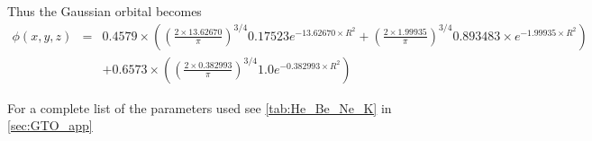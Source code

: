 Thus the Gaussian orbital becomes
\begin{eqnarray*}
\phi\left(x,y,z\right) & = & 0.4579\times\left(\left(\frac{2\times13.62670}{\pi}\right)^{3/4}0.17523e^{-13.62670\times R^{2}}+\left(\frac{2\times1.99935}{\pi}\right)^{3/4}0.893483\times e^{-1.99935\times R^{2}}\right)\\
 &  & +0.6573\times\left(\left(\frac{2\times0.382993}{\pi}\right)^{3/4}1.0e^{-0.382993\times R^{2}}\right)
\end{eqnarray*}


For a complete list of the parameters used see \cref{tab:He_Be_Ne_K} in \cref{sec:GTO_app}



